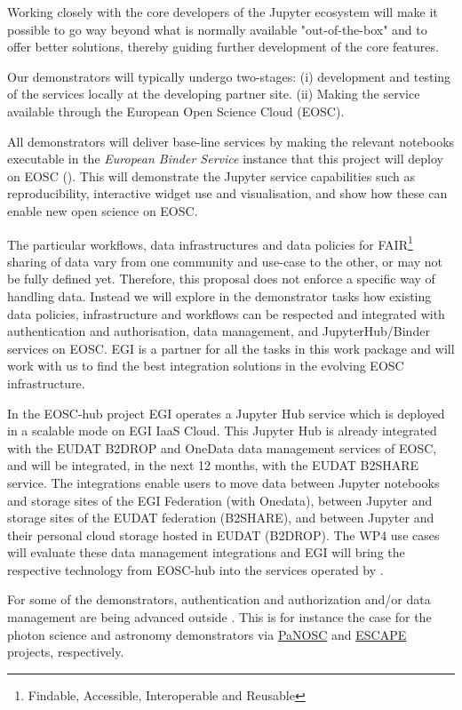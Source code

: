 \begin{workpackage}
\begin{wpdescription}
  Working closely with the core developers of the Jupyter ecosystem will make it possible to
  go way beyond what is normally available "out-of-the-box" and to offer better solutions,
  thereby guiding further development of the core features.

  \medskip
  Our demonstrators will typically undergo two-stages: (i)
  development and testing of the services locally at the developing partner
  site. (ii) Making the service available through the European Open
  Science Cloud (EOSC).

  All demonstrators will deliver base-line services by making the
  relevant notebooks executable in the \emph{European Binder Service} instance that this
  project will deploy on EOSC (). This will demonstrate
  the Jupyter service capabilities such as reproducibility, interactive
  widget use and visualisation, and show how these can
  enable new open science on EOSC.

  The particular workflows, data infrastructures and data policies for
  FAIR\footnote{Findable, Accessible, Interoperable and Reusable} sharing of data vary from one community and use-case to
  the other, or may not be fully defined yet. Therefore, this proposal
  does not enforce a specific way of handling data. Instead we
  will explore in the demonstrator tasks how existing data policies,
  infrastructure and workflows can be respected and integrated with
  authentication and authorisation, data management, and
  JupyterHub/Binder services on EOSC. EGI is a partner
  for all the tasks in this work package and will work with us to find the
  best integration solutions in the evolving EOSC
  infrastructure.

  In the EOSC-hub project EGI operates a Jupyter Hub service which is deployed
  in a scalable mode on EGI IaaS Cloud. This Jupyter Hub is already integrated
  with the EUDAT B2DROP and OneData data management services of EOSC, and will
  be integrated, in the next 12 months, with the EUDAT B2SHARE service.
  The integrations enable users to move data between Jupyter notebooks and storage
  sites of the EGI Federation (with Onedata), between Jupyter and storage sites
  of the EUDAT federation (B2SHARE), and between Jupyter and their personal cloud
  storage hosted in EUDAT (B2DROP). The WP4 use cases will evaluate these data management
  integrations and EGI will bring the respective technology from EOSC-hub into the
  services operated by \TheProject.

  For some of the demonstrators, authentication and authorization and/or
  data management are being advanced outside \TheProject.
  This is for instance the case for the photon science and astronomy
  demonstrators via \href{https://panosc-eu.github.io/}{PaNOSC} and
  \href{https://www.eso.org/public/announcements/ann18084/}{ESCAPE} projects, respectively.


\end{wpdescription}
\end{workpackage}
